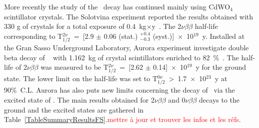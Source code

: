 \documentclass[main.tex]{subfiles}
\begin{document}
\bigskip


\NI More recently the study of the \Cd~decay has continued mainly using CdWO$_{\text{4}}$ scintillator crystals. The Solotvina experiment reported the results obtained with 330 g of crystals for a total exposure  of 0.4~kg$\times$y~\cite{Solotvina}. The 2$\nu\beta\beta$ half-life corresponding to T$_{\text{1}/\text{2}}^{\text{2}\nu}$~=~[2.9 $\pm$ 0.06 (stat.) $^{+\text{0.4}}_{-\text{0.3}}$ (syst.)]~$\times$~10$^{\text{19}}$~y. Installed at the Gran Sasso Underground Laboratory, Aurora experiment investigate double beta decay of \Cd~ with 1.162~kg of crystal scintillators enriched to 82~\%~\cite{Aurora}. The half-life of 2$\nu\beta\beta$ was measured to be T$_{\text{1}/\text{2}}^{\text{2}\nu}$~=~[2.62 $\pm$ 0.14]~$\times$~10$^{\text{19}}$~y for the ground state. The lower limit on the half-life was set to T$_{\text{1}/\text{2}}^{\text{0}\nu}$~>~1.7~$\times$~10$^{\text{23}}$~y at 90\%~C.L. Aurora has also puts new limits concerning the decay of \Cd~via the excited state of \Sn. The main results obtained for 2$\nu\beta\beta$ and 0$\nu\beta\beta$ decays to the ground and the excited states are gathered in Table~\ref{TableSummaryResultsFS}.\textcolor{red}{mettre à jour et trouver les infos et les réfs}.
\end{document}
